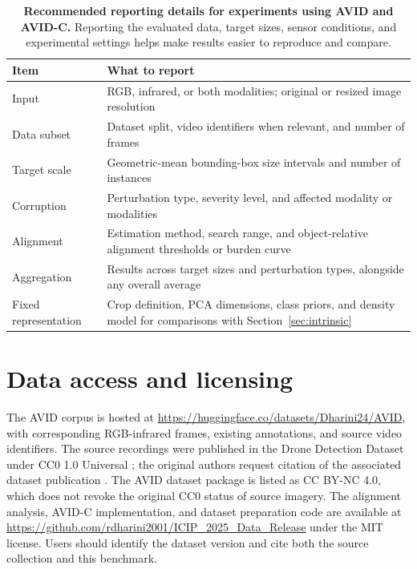 \documentclass[10pt]{article}
\newcommand{\dataset}{\textsc{AVID}}
\newcommand{\corrupt}{\textsc{AVID-C}}
\begin{document}
\begin{table}[t]
\centering
\caption{\textbf{Recommended reporting details for experiments using \dataset{} and \corrupt{}.}
Reporting the evaluated data, target sizes, sensor conditions, and experimental settings helps make results easier to reproduce and compare.}
\label{tab:reporting}
\small
\begin{tabularx}{\linewidth}{@{}l X@{}}
\toprule
Item & What to report \\
\midrule

Input
& RGB, infrared, or both modalities; original or resized image resolution \\

Data subset
& Dataset split, video identifiers when relevant, and number of frames \\

Target scale
& Geometric-mean bounding-box size intervals and number of instances \\

Corruption
& Perturbation type, severity level, and affected modality or modalities \\

Alignment
& Estimation method, search range, and object-relative alignment thresholds or burden curve \\

Aggregation
& Results across target sizes and perturbation types, alongside any overall average \\

Fixed representation
& Crop definition, PCA dimensions, class priors, and density model for comparisons with Section~\ref{sec:intrinsic} \\

\bottomrule
\end{tabularx}
\end{table}


\section{Data access and licensing}
\label{sec:repro}

The \dataset{} corpus is hosted at \url{https://huggingface.co/datasets/Dharini24/AVID}, with corresponding RGB-infrared frames, existing annotations, and source video identifiers. The source recordings were published in the Drone Detection Dataset under CC0 1.0 Universal \citep{svanstrom2020repository}; the original authors request citation of the associated dataset publication \citep{svanstrom2021multisensor}. The AVID dataset package is listed as CC BY-NC 4.0, which does not revoke the original CC0 status of source imagery. The alignment analysis, \corrupt{} implementation, and dataset preparation code are available at \url{https://github.com/rdharini2001/ICIP_2025_Data_Release} under the MIT license. Users should identify the dataset version and cite both the source collection and this benchmark.
\end{document}
